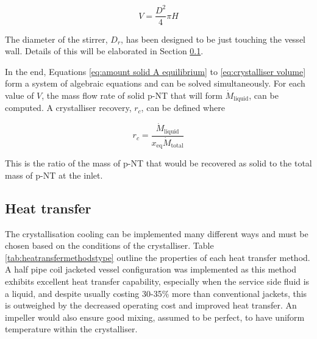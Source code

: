\begin{equation} \label{eq:crystalliser volume}
    V = \frac{D^2}{4} \pi H
\end{equation}

\noindent The diameter of the stirrer, $D_r$, has been designed to be just touching the vessel wall. Details of this will be elaborated in Section \ref{sec:heat transfer crystalliser}.

In the end, Equations \ref{eq:amount solid A equilibrium} to \ref{eq:crystalliser volume} form a system of algebraic equations and can be solved simultaneously. For each value of $V$, the mass flow rate of solid p-NT that will form $\dot{M}_{\mathrm{liquid}}$, can be computed. A crystalliser recovery, $r_c$, can be defined where

\begin{equation}
    r_c = \frac{\dot{M}_{\mathrm{liquid}}}{x_{\mathrm{eq}} \dot{M}_{\mathrm{total}}}
\end{equation}

\noindent This is the ratio of the mass of p-NT that would be recovered as solid to the total mass of p-NT at the inlet.

\subsection{Heat transfer}\label{sec:heat transfer crystalliser}

The crystallisation cooling can be implemented many different ways and must be chosen based on the conditions of the crystalliser. Table \ref{tab:heatransfermethodstype} outline the properties of each heat transfer method. A half pipe coil jacketed vessel configuration was implemented as this method exhibits excellent heat transfer capability, especially when the service side fluid is a liquid, and despite usually costing 30-35\% more than conventional jackets, this is outweighed by the decreased operating cost and improved heat transfer. An impeller would also ensure good mixing, assumed to be perfect, to have uniform temperature within the crystalliser. 

